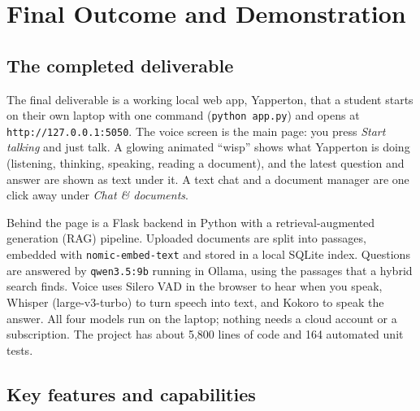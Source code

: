 \documentclass[11pt,a4paper]{article}
\begin{document}
\section{Final Outcome and Demonstration}

\subsection*{The completed deliverable}

The final deliverable is a working local web app, Yapperton, that a student
starts on their own laptop with one command (\texttt{python app.py}) and opens
at \texttt{http://127.0.0.1:5050}. The voice screen is the main page: you press
\emph{Start talking} and just talk. A glowing animated ``wisp'' shows what
Yapperton is doing (listening, thinking, speaking, reading a document), and the
latest question and answer are shown as text under it. A text chat and a
document manager are one click away under \emph{Chat \& documents}.

Behind the page is a Flask backend in Python with a retrieval-augmented
generation (RAG) pipeline. Uploaded documents are split into passages, embedded
with \texttt{nomic-embed-text} and stored in a local SQLite index. Questions
are answered by \texttt{qwen3.5:9b} running in Ollama, using the passages that
a hybrid search finds. Voice uses Silero VAD in the browser to hear when you
speak, Whisper (large-v3-turbo) to turn speech into text, and Kokoro to speak
the answer. All four models run on the laptop; nothing needs a cloud account or
a subscription. The project has about 5,800 lines of code and 164 automated
unit tests.

\subsection*{Key features and capabilities}
\end{document}

